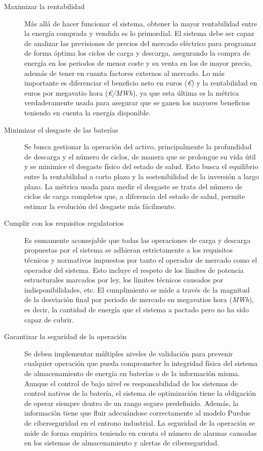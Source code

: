 \begin{description}

\item[Maximizar la rentabilidad] Más allá de hacer funcionar el sistema, obtener la mayor rentabilidad entre la energía comprada y vendida es lo primordial. El sistema debe ser capaz de analizar las previsiones de precios del mercado eléctrico para programar de forma óptima los ciclos de carga y descarga, asegurando la compra de energía en los periodos de menor coste y su venta en los de mayor precio, además de tener en cuanta factores externos al mercado. Lo más importante es diferenciar el beneficio neto en euros (\textit{€}) y la rentabilidad en euros por megavatio hora (\textit{€/MWh}), ya que esta última es la métrica verdaderamente usada para asegurar que se ganen los mayores beneficios teniendo en cuenta la energía disponible.

\item[Minimizar el desgaste de las baterías] Se busca gestionar la operación del activo, principalmente la profundidad de descarga y el número de ciclos, de manera que se prolongue su vida útil y se minimice el desgaste físico del estado de salud. Esto busca el equilibrio entre la rentabilidad a corto plazo y la sostenibilidad de la inversión a largo plazo. La métrica usada para medir el desgaste se trata del número de ciclos de carga completos que, a diferencia del estado de salud, permite estimar la evolución del desgaste más fácilmente.

\item[Cumplir con los requisitos regulatorios] Es sumamente aconsejable que todas las operaciones de carga y descarga propuestas por el sistema se adhieran estrictamente a los requisitos técnicos y normativos impuestos por tanto el operador de mercado como el operador del sistema. Esto incluye el respeto de los límites de potencia estructurales marcados por ley, los límites técnicos causados por indisponibilidades, etc. El cumplimiento se mide a través de la magnitud de la desviación final por periodo de mercado en megavatios hora (\textit{MWh}), es decir, la cantidad de energía que el sistema a pactado pero no ha sido capaz de cubrir.

\item[Garantizar la seguridad de la operación] Se deben implementar múltiples niveles de validación para prevenir cualquier operación que pueda comprometer la integridad física del sistema de almacenamiento de energía en baterías o de la información misma. Aunque el control de bajo nivel es responsabilidad de los sistemas de control nativos de la batería, el sistema de optimización tiene la obligación de operar siempre dentro de un rango seguro predefinido. Además, la información tiene que fluir adecuándose correctamente al modelo Purdue de ciberseguridad en el entrono industrial. La seguridad de la operación se mide de forma empírica teniendo en cuenta el número de alarmas causadas en los sistemas de almacenamiento y alertas de ciberseguridad.


\end{description}
